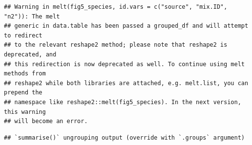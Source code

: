 \documentclass[
]{article}
\newenvironment{Shaded}{\begin{snugshade}}{\end{snugshade}}
\newcommand{\CommentTok}[1]{\textcolor[rgb]{0.56,0.35,0.01}{\textit{#1}}}
\newcommand{\DataTypeTok}[1]{\textcolor[rgb]{0.13,0.29,0.53}{#1}}
\newcommand{\KeywordTok}[1]{\textcolor[rgb]{0.13,0.29,0.53}{\textbf{#1}}}
\newcommand{\NormalTok}[1]{#1}
\newcommand{\OperatorTok}[1]{\textcolor[rgb]{0.81,0.36,0.00}{\textbf{#1}}}
\newcommand{\StringTok}[1]{\textcolor[rgb]{0.31,0.60,0.02}{#1}}
\begin{document}
\begin{verbatim}
## Warning in melt(fig5_species, id.vars = c("source", "mix.ID", "n2")): The melt
## generic in data.table has been passed a grouped_df and will attempt to redirect
## to the relevant reshape2 method; please note that reshape2 is deprecated, and
## this redirection is now deprecated as well. To continue using melt methods from
## reshape2 while both libraries are attached, e.g. melt.list, you can prepend the
## namespace like reshape2::melt(fig5_species). In the next version, this warning
## will become an error.
\end{verbatim}

\begin{Shaded}
\end{Shaded}

\begin{verbatim}
## `summarise()` ungrouping output (override with `.groups` argument)
\end{verbatim}

\begin{Shaded}
\end{Shaded}
\end{document}
